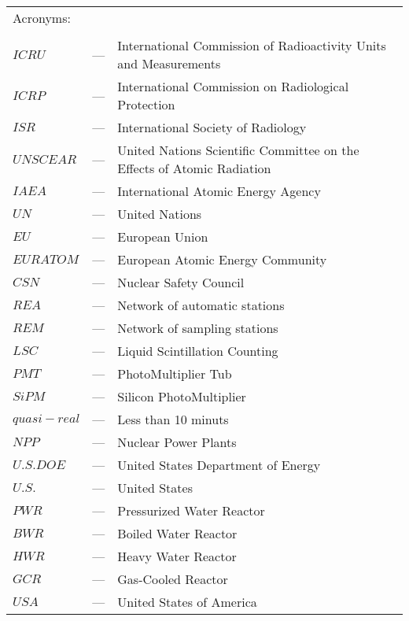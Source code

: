 \begin{longtable}{p{25mm} c p{120mm} }
\multicolumn{3}{l}{Acronyms:}\\
\\
$ICRU$ & --- & International Commission of Radioactivity Units and Measurements\\
$ICRP$ & --- & International Commission on Radiological Protection \\
$ISR$ & --- & International Society of Radiology \\
$UNSCEAR$ & --- & United Nations Scientific Committee on the Effects of Atomic Radiation\\
$IAEA$ & --- & International Atomic Energy Agency \\
$UN$ & --- & United Nations\\
$EU$ & --- & European Union\\
$EURATOM$ & --- & European Atomic Energy Community\\
$CSN$ & --- & Nuclear Safety Council\\
$REA$ & --- & Network of automatic stations\\
$REM$ & --- & Network of sampling stations\\
$LSC$ & --- & Liquid Scintillation Counting\\
$PMT$ & --- & PhotoMultiplier Tub\\
$SiPM$ & --- & Silicon PhotoMultiplier\\
$quasi-real$ & --- & Less than 10 minuts\\
$NPP$ & --- & Nuclear Power Plants\\
$U.S. DOE$ & --- & United States Department of Energy\\
$U.S.$ & --- & United States\\
$PWR$ & --- & Pressurized Water Reactor\\
$BWR$ & --- & Boiled Water Reactor\\
$HWR$ & --- & Heavy Water Reactor\\
$GCR$ & --- & Gas-Cooled Reactor\\
$USA$ & --- & United States of America\\




\end{longtable}
